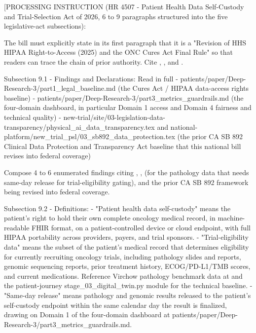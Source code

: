 
[PROCESSING INSTRUCTION (HR 4507 - Patient Health Data Self-Custody
and Trial-Selection Act of 2026, 6 to 9 paragraphs structured into
the five legislative-act subsections):

The bill must explicitly state in its first paragraph that it is a
"Revision of HHS HIPAA Right-to-Access (2025) and the ONC Cures Act
Final Rule" so that readers can trace the chain of prior authority.
Cite \cite{hhs_right_to_access_2025},
\cite{onc_cures_act_final_rule_page}, and
\cite{federal_register_info_blocking_disincentives_2024}.

Subsection 9.1 - Findings and Declarations: Read in full
- patients/paper/Deep-Research-3/part1\_legal\_baseline.md (the
  Cures Act / HIPAA data-access rights baseline)
- patients/paper/Deep-Research-3/part3\_metrics\_guardrails.md (the
  four-domain dashboard, in particular Domain 1 access and Domain 4
  fairness and technical quality)
- new-trial/site/03-legislation-data-transparency/physical\_ai\_data\_transparency.tex
  and national-platform/new\_trial\_psl/03\_sb892\_data\_protection.tex
  (the prior CA SB 892 Clinical Data Protection and Transparency Act
  baseline that this national bill revises into federal coverage)

Compose 4 to 6 enumerated findings citing
\cite{astp_onc_patient_portals_apps_2024},
\cite{astp_onc_hospital_apis_2024}, \cite{vorontsov2024virchow} (for
the pathology data that needs same-day release for trial-eligibility
gating), and the prior CA SB 892 framework being revised into federal
coverage.

Subsection 9.2 - Definitions:
- "Patient health data self-custody" means the patient's right to
  hold their own complete oncology medical record, in machine-
  readable FHIR format, on a patient-controlled device or cloud
  endpoint, with full HIPAA portability across providers, payers,
  and trial sponsors.
- "Trial-eligibility data" means the subset of the patient's medical
  record that determines eligibility for currently recruiting
  oncology trials, including pathology slides and reports, genomic
  sequencing reports, prior treatment history, ECOG/PD-L1/TMB
  scores, and current medications. Reference Virchow pathology
  benchmark data at \cite{vorontsov2024virchow} and the
  patient-journey stage\_03\_digital\_twin.py module for the technical
  baseline.
- "Same-day release" means pathology and genomic results released to
  the patient's self-custody endpoint within the same calendar day
  the result is finalized, drawing on Domain 1 of the four-domain
  dashboard at patients/paper/Deep-Research-3/part3\_metrics\_guardrails.md.

